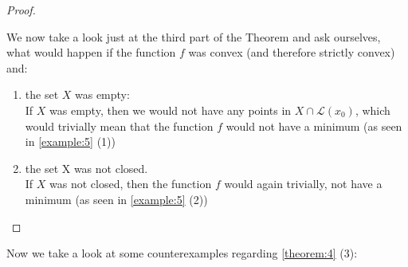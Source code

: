 \begin{proof}
\begin{enumerate}[label=(\arabic*)]
		We now take a look just at the third part of the Theorem and ask ourselves, what would happen if the function $f$ was convex (and therefore strictly convex) and: 
		\begin{enumerate}
			\item the set $X$ was empty: \\
			If $X$ was empty, then we would not have any points in $X \cap \mathcal{L}(x_0)$, which would trivially mean that the function $f$ would not have a minimum (as seen in \cref{example:5} (1))
			\item the set X was not closed. \\
			If $X$ was not closed, then the function $f$ would again trivially, not have a minimum (as seen in \cref{example:5} (2))
		\end{enumerate}
	\end{enumerate}
\end{proof}

Now we take a look at some counterexamples regarding \cref{theorem:4} (3): 

